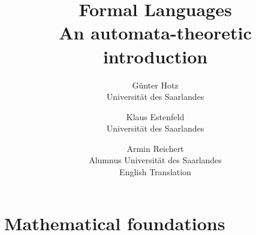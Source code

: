 \documentclass{amsbook}
\begin{document}
\title{
	Formal Languages\\
	An automata-theoretic introduction}

\author{
	G\"unter Hotz\\
	Universit\"at des Saarlandes
\and
	Klaus Estenfeld\\
	Universit\"at des Saarlandes
\and
	Armin Reichert\\
	Alumnus Universit\"at des Saarlandes\\
	English Translation
}

\maketitle


\tableofcontents


\chapter{Mathematical foundations}




\end{document}
